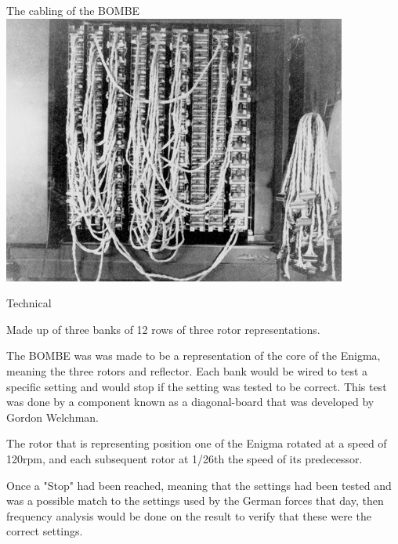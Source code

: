 \documentclass[final]{beamer}
\begin{document}
\begin{frame}{}
\begin{columns}[t]
\begin{column}{.32\linewidth}
         \begin{block}{The cabling of the BOMBE}
          \includegraphics[width=\columnwidth]{bombeCable.png} 
        \end{block}
        
        \begin{block}{Technical}
          \begin{itemize}\small{
          \item Made up of three banks of 12 rows of three rotor representations.
          \item The BOMBE was was made to be a representation of the core of the Enigma, meaning the three rotors and reflector. Each bank would be wired to test a specific setting and would stop if the setting was tested to be correct. This test was done by a component known as a diagonal-board that was developed by Gordon Welchman.
          \item The rotor that is representing position one of the Enigma rotated at a speed of 120rpm, and each subsequent rotor at 1/26th the speed of its predecessor.
          \item Once a "Stop" had been reached, meaning that the settings had been tested and was a possible match to the settings used by the German forces that day, then frequency analysis would be done on the result to verify that these were the correct settings.}
          \end{itemize}
        \end{block}

      \end{column}
      

\end{columns}
\end{frame}
\end{document}

